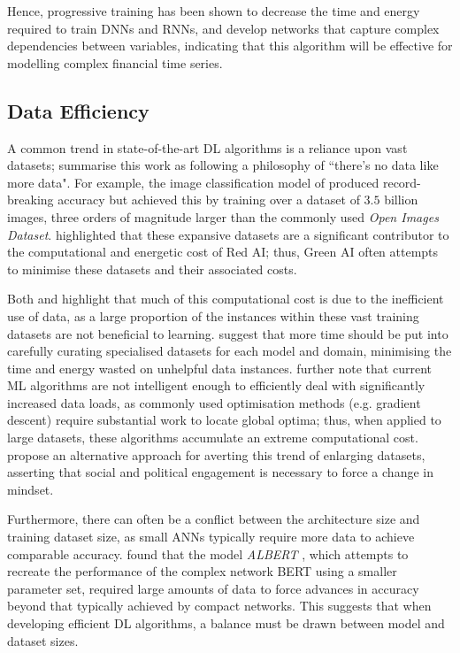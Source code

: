 \documentclass[a4paper, 11pt]{report}
\begin{document}
    Hence, progressive training has been shown to decrease the time and energy required to train DNNs and RNNs, and develop networks that capture complex dependencies between variables, indicating that this algorithm will be effective for modelling complex financial time series.


    \subsection{Data Efficiency}

    A common trend in state-of-the-art DL algorithms is a reliance upon vast datasets; \citet{bender-2021} summarise this work as following a philosophy of ``there's no data like more data". For example, the image classification model of \citet{mahajan-2018} produced record-breaking accuracy but achieved this by training over a dataset of $3.5$ billion images, three orders of magnitude larger than the commonly used \emph{Open Images Dataset}. \citet{schwartz-2019} highlighted that these expansive datasets are a significant contributor to the computational and energetic cost of Red AI; thus, Green AI often attempts to minimise these datasets and their associated costs.

    Both \citet{bender-2021} and \citet{walsh-2021} highlight that much of this computational cost is due to the inefficient use of data, as a large proportion of the instances within these vast training datasets are not beneficial to learning. \citet{bender-2021} suggest that more time should be put into carefully curating specialised datasets for each model and domain, minimising the time and energy wasted on unhelpful data instances. \citet{aljarrah-2015} further note that current ML algorithms are not intelligent enough to efficiently deal with significantly increased data loads, as commonly used optimisation methods (e.g. gradient descent) require substantial work to locate global optima; thus, when applied to large datasets, these algorithms accumulate an extreme computational cost. \citet{bietti-2019} propose an alternative approach for averting this trend of enlarging datasets, asserting that social and political engagement is necessary to force a change in mindset.
  

    Furthermore, there can often be a conflict between the architecture size and training dataset size, as small ANNs typically require more data to achieve comparable accuracy. \citet{bender-2021} found that the model \emph{ALBERT} \citep{lan-2020}, which attempts to recreate the performance of the complex network BERT using a smaller parameter set, required large amounts of data to force advances in accuracy beyond that typically achieved by compact networks. This suggests that when developing efficient DL algorithms, a balance must be drawn between model and dataset sizes.
\end{document}
